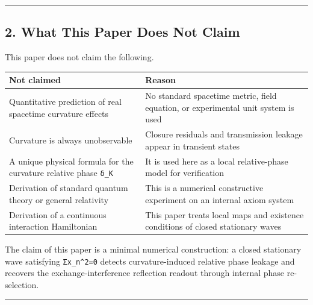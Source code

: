 \documentclass[
  a4paper,
]{article}
\newcounter{none} %
\begin{document}
\begin{center}\rule{0.5\linewidth}{0.5pt}\end{center}

\subsection{2. What This Paper Does Not
Claim}\label{what-this-paper-does-not-claim}

This paper does not claim the following.

{\def\LTcaptype{none} %
\begin{longtable}[]{@{}
  >{\raggedright\arraybackslash}p{}
  >{\raggedright\arraybackslash}p{}@{}}
\toprule\noalign{}
\begin{minipage}[b]{\linewidth}\raggedright
Not claimed
\end{minipage} & \begin{minipage}[b]{\linewidth}\raggedright
Reason
\end{minipage} \\
\midrule\noalign{}
\endhead
\bottomrule\noalign{}
\endlastfoot
Quantitative prediction of real spacetime curvature effects & No
standard spacetime metric, field equation, or experimental unit system
is used \\
Curvature is always unobservable & Closure residuals and transmission
leakage appear in transient states \\
A unique physical formula for the curvature relative phase \texttt{δ\_K}
& It is used here as a local relative-phase model for verification \\
Derivation of standard quantum theory or general relativity & This is a
numerical constructive experiment on an internal axiom system \\
Derivation of a continuous interaction Hamiltonian & This paper treats
local maps and existence conditions of closed stationary waves \\
\end{longtable}
}

The claim of this paper is a minimal numerical construction: a closed
stationary wave satisfying \texttt{Σx\_n\^{}2=0} detects
curvature-induced relative phase leakage and recovers the
exchange-interference reflection readout through internal phase
re-selection.

\begin{center}\rule{0.5\linewidth}{0.5pt}\end{center}
\end{document}
